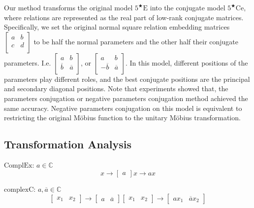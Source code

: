 \documentclass[11pt]{article}
\begin{document}
Our method transforms the original model $5^{\bigstar}\mathrm{E}$ into the conjugate model $5^{\bigstar}\mathrm{Ce}$, where relations are represented as the real part of low-rank conjugate matrices.
Specifically, we set the original normal square relation embedding matrices 
$\begin{bmatrix}
    a & b\\
    c & d\\
\end{bmatrix}$
to be half the normal parameters and the other half their conjugate parameters. I.e.
$\begin{bmatrix}
    a & b\\
    \overline{b} & \overline{a}\\
\end{bmatrix}$, or 
$\begin{bmatrix}
    a & b\\
    -\overline{b} & \overline{a}\\
\end{bmatrix}$.
In this model, different positions of the parameters play different roles, and the best conjugate positions are the principal and secondary diagonal positions.
Note that experiments showed that, the parameters conjugation or negative parameters conjugation method achieved the same accuracy. 
Negative parameters conjugation on this model is equivalent to restricting the original Möbius function to the unitary Möbius transformation.

\subsection{Transformation Analysis}
$\mathrm{ComplEx}$: $a\in \mathbb{C}$
\[
    x \rightarrow
    \begin{bmatrix}
        a
    \end{bmatrix}
    x
    \rightarrow
    ax
    \]

$\mathrm{complexC}$: $a,\overline{a} \in \mathbb{C}$
\[
    \begin{bmatrix}
        x_1 & x_2
    \end{bmatrix} 
    \rightarrow
    \begin{bmatrix}
        a & \overline{a}
    \end{bmatrix}
    \begin{bmatrix}
        x_1 & x_2
    \end{bmatrix}
    \rightarrow
    \begin{bmatrix}
        ax_1 & \overline{a}x_2
    \end{bmatrix}
    \]
\end{document}
